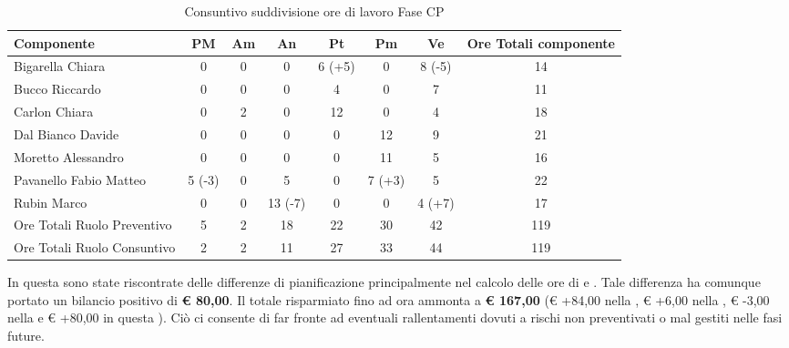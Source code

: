 			\begin{table}[H]
				\begin{center}
					\begin{tabular}{| l | c | c | c | c | c | c | c |}
						\hline
						Componente 					& PM	& Am 	& An 	& Pt 		& Pm 	& Ve 		& Ore Totali componente \\ \hline
						
						Bigarella Chiara 			& 0		& 0		& 0		& 6 (+5)		& 0		& 8 (-5)		& 14 \\
						Bucco Riccardo 				& 0		& 0		& 0		& 4 		& 0		& 7 		& 11 \\
						Carlon Chiara	 			& 0		& 2 	& 0		& 12 		& 0		& 4 		& 18 \\
						Dal Bianco Davide 			& 0		& 0		& 0		& 0			& 12 	& 9 		& 21 \\
						Moretto Alessandro 			& 0		& 0		& 0		& 0			& 11 	& 5			& 16 \\
						Pavanello Fabio Matteo	 	& 5 (-3) & 0	& 5		& 0			& 7 (+3) & 5 		& 22 \\
						Rubin Marco					& 0		& 0		& 13 (-7) & 0		& 0		& 4 (+7)	& 17 \\ \hline \hline
						
						Ore Totali Ruolo Preventivo & 5 	& 2 	& 18 	& 22 		& 30 	& 42 		& 119\\ 
						Ore Totali Ruolo Consuntivo & 2 	& 2 	& 11 	& 27 		& 33 	& 44 		& 119\\ \hline
					\end{tabular}
				\end{center}
				\caption{Consuntivo suddivisione ore di lavoro Fase CP}
			\end{table}

			In questa  sono state riscontrate delle differenze di pianificazione principalmente nel calcolo delle ore di  e . Tale differenza ha comunque portato un bilancio positivo di \textbf{\euro{} 80,00}.
			Il totale risparmiato fino ad ora ammonta a \textbf{\euro{} 167,00} (\euro{} +84,00 nella , \euro{} +6,00 nella , \euro{} -3,00 nella  e \euro{} +80,00 in questa ). Ciò ci consente di far fronte ad eventuali rallentamenti dovuti a rischi non preventivati o mal gestiti nelle fasi future.
	
